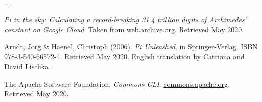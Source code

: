 \documentclass[12pt]{article}
\begin{document}
...

\begin{thebibliography}{9} %
  

    \textit{Pi in the sky: Calculating a record-breaking 31.4 trillion digits of Archimedes' constant on Google Cloud}.
    Taken from \href{https://web.archive.org/web/20191019023120/https://cloud.google.com/blog/products/compute/calculating-31-4-trillion-digits-of-archimedes-constant-on-google-cloud}{web.archive.org}.
    Retrieved May 2020.

    Arndt, Jorg \& Haenel, Christoph (2006).
    \textit{Pi Unleashed}, in Springer-Verlag.
    ISBN 978-3-540-66572-4.
    Retrieved May 2020.
    English translation by Catriona and David Lischka.

    The Apache Software Foundation,
    \textit{Commons CLI}.
    \href{https://commons.apache.org/proper/commons-cli/}{commons.apache.org}.
    Retrieved May 2020.


\end{thebibliography}

\clearpage
\end{document}
